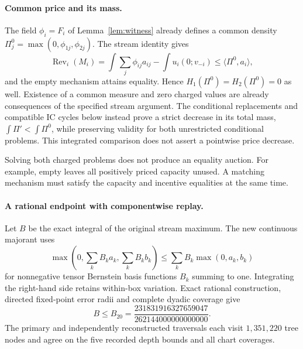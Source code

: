 \paragraph{Common price and its mass.}
The field $\phi_i=F_i$ of Lemma~\ref{lem:witness} already defines
a common density $\Pi^0_j=\max(0,\phi_{1j},\phi_{2j})$. The stream identity gives
\[
 \operatorname{Rev}_i(M_i)=\int\sum_j\phi_{ij}a_{ij}-\int u_i(0;v_{-i})
 \le\langle\Pi^0,a_i\rangle,
\]
and the empty mechanism attains equality. Hence
$H_1(\Pi^0)=H_2(\Pi^0)=0$ as well. Existence of a common measure and
zero charged values are already consequences of the specified stream
argument. The conditional replacements and compatible IC cycles below
instead prove a strict decrease in its total mass,
$\int\Pi'<\int\Pi^0$, while preserving validity for both unrestricted
conditional problems. This integrated comparison does not assert a
pointwise price decrease.

Solving both charged problems does not produce an equality auction.
For example, empty leaves all positively priced capacity unused.
A matching mechanism must satisfy the capacity and incentive equalities
at the same time.

\paragraph{A rational endpoint with componentwise replay.}
Let $B$ be the exact integral of the original stream maximum. The new
continuous majorant uses
\[
 \max\left(0,\sum_k B_k a_k,\sum_k B_k b_k\right)
 \le\sum_k B_k\max(0,a_k,b_k)
\]
for nonnegative tensor Bernstein basis functions $B_k$ summing to one.
Integrating the right-hand side retains within-box variation. Exact
rational construction, directed fixed-point error radii and complete
dyadic coverage give
\[
 B\le B_{20}=\frac{231831916327659047}{262144000000000000}.
\]
The primary and independently reconstructed traversals each visit
$1{,}351{,}220$ tree nodes and agree on the five recorded depth bounds
and all chart coverages.

